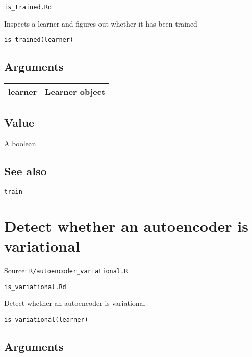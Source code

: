 \texttt{is\_trained.Rd}

Inspects a learner and figures out whether it has been trained

\begin{verbatim}
is_trained(learner)
\end{verbatim}

\hypertarget{arguments}{\subsection{\texorpdfstring{\protect\hyperlink{arguments}{}Arguments}{Arguments}}\label{arguments}}

\begin{longtable}[c]{@{}>{\small}p{3cm}>{\raggedright}p{12.5cm}@{}}
\toprule
learner & Learner object\tabularnewline
\bottomrule
\end{longtable}

\hypertarget{value}{\subsection{\texorpdfstring{\protect\hyperlink{value}{}Value}{Value}}\label{value}}

A boolean

\hypertarget{see-also}{\subsection{\texorpdfstring{\protect\hyperlink{see-also}{}See
also}{See also}}\label{see-also}}

\texttt{train}

\section{Detect whether an autoencoder is
variational}\label{detect-whether-an-autoencoder-is-variational}

Source:
\href{https://github.com/fdavidcl/ruta/blob/master/R/autoencoder_variational.R}{\texttt{R/autoencoder\_variational.R}}

\texttt{is\_variational.Rd}

Detect whether an autoencoder is variational

\begin{verbatim}
is_variational(learner)
\end{verbatim}

\hypertarget{arguments}{\subsection{\texorpdfstring{\protect\hyperlink{arguments}{}Arguments}{Arguments}}\label{arguments}}

